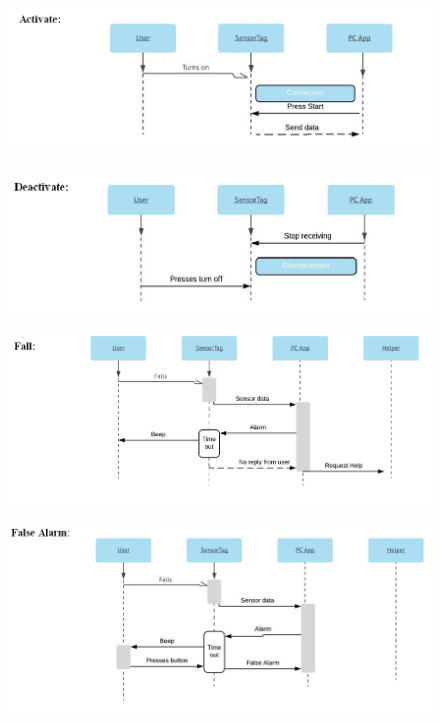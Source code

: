 \documentclass[conference,12pt]{IEEETran}
\begin{document}
\FloatBarrier
\begin{figure}[!h]
	\centering
	\includegraphics[scale=0.4]{images/Seq_Activate.png}
	\label{img:activate}
\end{figure}
\FloatBarrier

\FloatBarrier
\begin{figure}[!h]
	\centering
	\includegraphics[scale=0.4]{images/Seq_Deactivate.png}
	\label{img:deactiv}
\end{figure}
\FloatBarrier

\FloatBarrier
\begin{figure}[!h]
	\centering
	\includegraphics[scale=0.4]{images/Seq_Fall.png}
	\label{img:fall}
\end{figure}
\FloatBarrier

\FloatBarrier
\begin{figure}[!h]
	\centering
	\includegraphics[scale=0.4]{images/Seq_FalseAl.png}
	\label{img:falseal}
\end{figure}
\FloatBarrier
\end{document}
